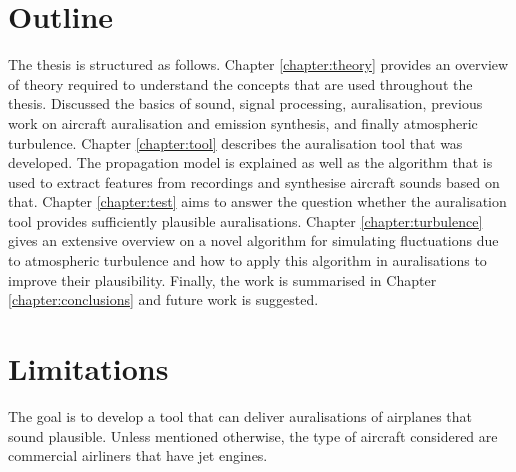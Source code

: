 \section{Outline}
The thesis is structured as follows.
\newline
\newline
Chapter \ref{chapter:theory} provides an overview of theory required to understand the concepts that are used throughout the thesis.
Discussed the basics of sound, signal processing, auralisation, previous work on aircraft auralisation and emission synthesis, and finally atmospheric turbulence.
\newline
\newline
Chapter \ref{chapter:tool} describes the auralisation tool that was developed. The propagation model is explained as well as the algorithm that is used to extract features from recordings and synthesise aircraft sounds based on that.
\newline
\newline
Chapter \ref{chapter:test} aims to answer the question whether the auralisation
tool provides sufficiently plausible auralisations.
\newline
\newline
Chapter \ref{chapter:turbulence} gives an extensive overview on a novel
algorithm for simulating fluctuations due to atmospheric turbulence and how to
apply this algorithm in auralisations to improve their plausibility.
\newline
\newline
Finally, the work is summarised in Chapter \ref{chapter:conclusions} and future work is suggested.


\section{Limitations}
The goal is to develop a tool that can deliver auralisations of airplanes that
sound plausible. Unless mentioned otherwise, the type of aircraft considered are
commercial airliners that have jet engines.


%


